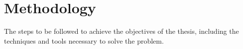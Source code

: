 \chapter{Methodology}

The steps to be followed to achieve the objectives of the thesis, including the techniques and tools necessary to solve the problem.